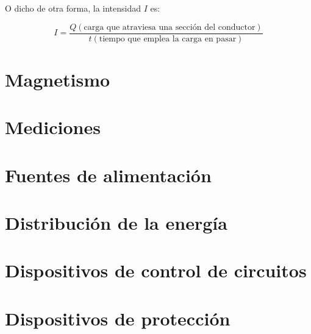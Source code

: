 \documentclass{article}
\begin{document}
O dicho de otra forma, la intensidad $I$ es:

$$ I = \frac{Q (\text{carga que atraviesa una sección del conductor})}{t(\text{tiempo que emplea la carga en pasar})}$$

\pagebreak



\section{Magnetismo}
\section{Mediciones}
\section{Fuentes de alimentación}
\section{Distribución de la energía}
\section{Dispositivos de control de circuitos}
\section{Dispositivos de protección}
\end{document}
